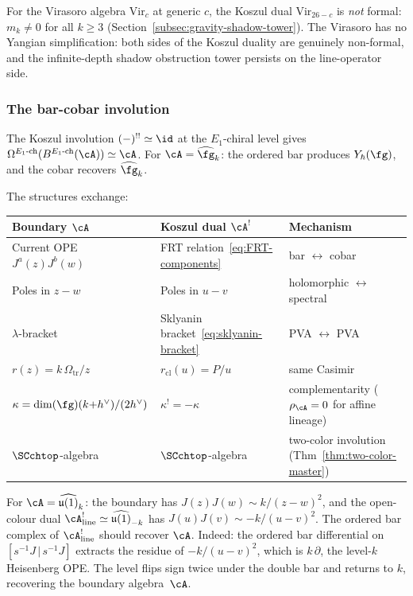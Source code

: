 \begin{remark}
\label{rem:yangian-virasoro-nonformality}
For the Virasoro algebra $\mathrm{Vir}_c$ at generic $c$,
the Koszul dual $\mathrm{Vir}_{26-c}$ is \emph{not} formal:
$m_k \ne 0$ for all $k \ge 3$
(Section~\ref{subsec:gravity-shadow-tower}). The Virasoro
has no Yangian simplification: both sides of the Koszul
duality are genuinely non-formal, and the infinite-depth
shadow obstruction tower persists on the line-operator side.
\end{remark}

\subsubsection*{The bar-cobar involution}

The Koszul involution $(-)^{!!} \simeq \id$ at the
$E_1$-chiral level gives
$\Omega^{E_1\text{-ch}}(B^{E_1\text{-ch}}(\cA)) \simeq \cA$.
For $\cA = \widehat{\fg}_k$: the ordered bar produces
$Y_\hbar(\fg)$, and the cobar recovers $\widehat{\fg}_k$.

The structures exchange:
\begin{center}
\small
\renewcommand{\arraystretch}{1.15}
\begin{tabular}{lll}
\textbf{Boundary $\cA$} &
 \textbf{Koszul dual $\cA^!$} &
 \textbf{Mechanism} \\
\hline
Current OPE $J^a(z)J^b(w)$ &
 FRT relation~\eqref{eq:FRT-components} &
 bar $\leftrightarrow$ cobar \\[2pt]
Poles in $z - w$ &
 Poles in $u - v$ &
 holomorphic $\leftrightarrow$ spectral \\[2pt]
$\lambda$-bracket &
 Sklyanin bracket~\eqref{eq:sklyanin-bracket} &
 PVA $\leftrightarrow$ PVA \\[2pt]
$r(z) = k\,\Omega_{\mathrm{tr}}/z$ &
 $r_{\mathrm{cl}}(u) = P/u$ &
 same Casimir \\[2pt]
$\kappa = \dim(\fg)(k{+}h^\vee)/(2h^\vee)$ &
 $\kappa^! = -\kappa$ &
 complementarity ($\rho_\cA = 0$ for affine lineage) \\[2pt]
$\SCchtop$-algebra &
 $\SCchtop$-algebra &
 two-color involution (Thm~\ref{thm:two-color-master})
\end{tabular}
\end{center}

\begin{computation}
\label{comp:heisenberg-bar-cobar}
For $\cA = \widehat{\mathfrak{u}(1)}_k$: the boundary has
$J(z)J(w) \sim k/(z-w)^2$, and the open-colour dual
$\cA^!_{\mathrm{line}} \simeq \widehat{\mathfrak{u}(1)}_{-k}$ has
$J(u)J(v) \sim -k/(u-v)^2$. The ordered bar complex of
$\cA^!_{\mathrm{line}}$ should recover $\cA$. Indeed: the
ordered bar differential on
$[s^{-1}J \,|\, s^{-1}J]$ extracts the
residue of $-k/(u-v)^2$, which is $k\,\partial$, the level-$k$
Heisenberg OPE. The level flips sign twice under the double
bar and returns to $k$, recovering the boundary algebra~$\cA$.
\end{computation}

